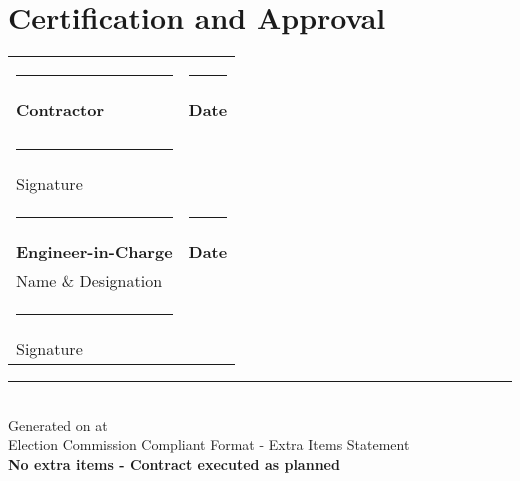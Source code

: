 \documentclass[12pt,a4paper]{article}
\begin{document}
\vspace{2cm}
\section*{Certification and Approval}

\begin{center}
\begin{tabular}{p{6cm}p{6cm}}
\rule{5cm}{0.5pt} & \rule{5cm}{0.5pt} \\
\textbf{Contractor} & \textbf{Date} \\
 & \\
\rule{5cm}{0.5pt} & \\
Signature & \\[1.5cm]

\rule{5cm}{0.5pt} & \rule{5cm}{0.5pt} \\
\textbf{Engineer-in-Charge} & \textbf{Date} \\
Name \& Designation & \\
\rule{5cm}{0.5pt} & \\
Signature & \\[1.5cm]

\end{tabular}
\end{center}

\vspace{2cm}
\begin{center}
\rule{\textwidth}{1pt}\\
\small
Generated on  at \\
Election Commission Compliant Format - Extra Items Statement\\
\textcolor{approvedgreen}{\textbf{No extra items - Contract executed as planned}}
\end{center}
\end{document}
